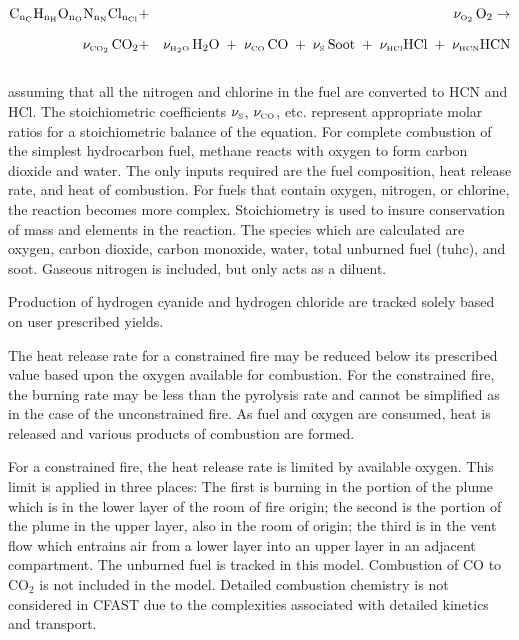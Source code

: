 \begin{eqnarray}
   \mathrm{C_{n_{\tiny \hbox{C}}}H_{n_H}O_{n_O}N_{n_N}Cl_{n_{Cl}}} &+&  \nu_{\tiny \hbox{O}_2} \, \mathrm{O_2}  \rightarrow  \nonumber \\[.1in]
   \nu_{\tiny \hbox{CO}_2} \, \mathrm{CO_2} &+& \nu_{\tiny \hbox{H}_2\hbox{O}} \, \mathrm{H_2O} \; + \; \nu_{\tiny \hbox{CO}} \, \mathrm{CO} \; + \; \nu_{\tiny \hbox{S}} \, \mathrm{Soot} \; + \; \nu_{\tiny \hbox{HCl}} \mathrm{HCl} \; + \; \nu_{\tiny \hbox{HCN}} \mathrm{HCN} \label{stoich}
\end{eqnarray} \\
assuming that all the nitrogen and chlorine in the fuel are converted to HCN and HCl. The stoichiometric coefficients $\nu_{\tiny \hbox{S}}$, $\nu_{\tiny \hbox{CO}}$, etc. represent appropriate molar ratios for a stoichiometric balance of the equation. For complete combustion of the simplest hydrocarbon fuel, methane reacts with oxygen to form carbon dioxide and water. The only inputs required are the fuel composition, heat release rate, and heat of combustion. For fuels that contain oxygen, nitrogen, or chlorine, the reaction becomes more complex. Stoichiometry is used to insure conservation of mass and elements in the reaction. The species which are calculated are oxygen, carbon dioxide, carbon monoxide, water, total unburned fuel (tuhc), and soot. Gaseous nitrogen is included, but only acts as a diluent.

Production of hydrogen cyanide and hydrogen chloride are tracked solely based on user prescribed yields.

The heat release rate for a constrained fire may be reduced below its prescribed value based upon the oxygen available for combustion. For the constrained fire, the burning rate may be less than the pyrolysis rate and cannot be simplified as in the case of the unconstrained fire. As fuel and oxygen are consumed, heat is released and various products of combustion are formed.

For a constrained fire, the heat release rate is limited by available oxygen. This limit is applied in three places: The first is burning in the portion of the plume which is in the lower layer of the room of fire origin; the second is the portion of the plume in the upper layer, also in the room of origin; the third is in the vent flow which entrains air from a lower layer into an upper layer in an adjacent compartment. The unburned fuel is tracked in this model. Combustion of CO to CO$_2$ is not included in the model. Detailed combustion chemistry is not considered in CFAST due to the complexities associated with detailed kinetics and transport.

